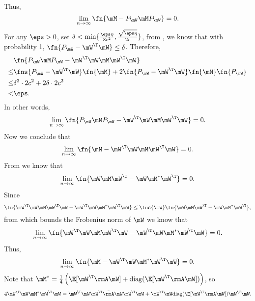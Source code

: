 Thus,
\begin{equation}
    \lim_{n\to\infty}\fn{\mM -P_\mW\mM P_\mW}=0.
\end{equation}
For any $\eps>0$, set $\delta<\min\{\frac{\eps\eta}{8c^2},\frac{\sqrt{\eps\eta}}{2c}\}$, from , we know that with probability 1, $\fn{P_\mW-\mW^\T\mW}\leq\delta$. Therefore,
\begin{equation}\begin{split}
    &\fn{P_\mW\mM P_\mW-\mW^\T\mW\mM \mW^\T\mW}\\ \leq& \fns{P_\mW-\mW^\T\mW}\fn{\mM } + 2\fn{P_\mW-\mW^\T\mW}\fn{\mM }\fn{P_\mW}\\
                           \leq& \delta^2\cdot 2c^2 + 2\delta\cdot 2c^2\\
                           <& \eps.
\end{split}\end{equation}
In other words, 
\begin{equation}
    \lim_{n\to\infty}\fn{P_\mW\mM P_\mW-\mW^\T\mW\mM \mW^\T\mW}=0.
\end{equation}
Now we conclude that
\begin{equation}
    \lim_{n\to\infty}\fn{\mM -\mW^\T\mW\mM \mW^\T\mW} = 0.
\end{equation}
From  we know that 
\begin{equation}
    \lim_{n\to\infty}\fn{\mW\mM \mW^\T-\mW\mM^*\mW^\T}=0.
\end{equation}
Since
\begin{equation}
    \fn{\mW^\T\mW\mM \mW^\T\mW-\mW^\T\mW\mM^*\mW^\T\mW}\leq \fns{\mW}\fn{\mW\mM \mW^\T-\mW\mM^*\mW^\T},
\end{equation}
from  which bounds the Frobenius norm of $\mW$ we know that
\begin{equation}
    \lim_{n\to\infty}\fn{\mW^\T\mW\mM \mW^\T\mW-\mW^\T\mW\mM^*\mW^\T\mW} = 0.
\end{equation}
Thus,
\begin{equation}
\label{eqn:M-equal-WTWMWTW}
    \lim_{n\to\infty}\fn{\mM-\mW^\T\mW\mM^*\mW^\T\mW} = 0.
\end{equation}
Note that $\mM^*=\frac14\left(\E[\mW^\T\rmA\mW]+\text{diag}(\E[\mW^\T\rmA\mW])\right)$, so
\begin{equation}
\label{eqn:M-approx-complex}
    4\mW^\T\mW\mM^*\mW^\T\mW = \mW^\T\mW\mW^\T\tilde{\rmA}\mW\mW^\T\mW + \mW^\T\mW\text{diag}(\E[\mW^\T\rmA\mW])\mW^\T\mW.
\end{equation}
